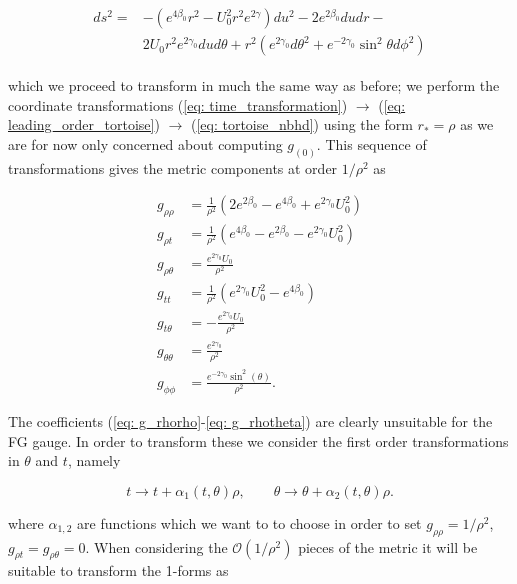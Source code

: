 \documentclass[a4paper,11pt]{article}
\numberwithin{equation}{section}
\begin{document}
\begin{align}
\begin{split} \label{eq: Bondi_metric_zero_functions}
ds^2=&-\left(e^{4\beta_{0}}r^2-U_{0}^2r^2e^{2\gamma}\right)du^2-2e^{2\beta_{0}}dudr- \\
&2U_{0}r^2e^{2\gamma_{0}}dud\theta+r^2(e^{2\gamma_{0}}d\theta^2+e^{-2\gamma_{0}}\sin^2\theta d\phi^2) 
\end{split}
\end{align}

\noindent which we proceed to transform in much the same way as before; we perform the coordinate transformations (\ref{eq: time_transformation}) $\rightarrow$ (\ref{eq: leading_order_tortoise}) $\rightarrow$ (\ref{eq: tortoise_nbhd}) using the form $r_*=\rho$ as we are for now only concerned about computing $g_{(0)}$. This sequence of transformations gives the metric components at order $1/\rho^2$ as 

\begin{subequations}
\begin{align}
g_{\rho \rho}&=\frac{1}{\rho^2}(2e^{2\beta_{0}}-e^{4\beta_{0}}+ e^{2\gamma_{0}} U_{0}^2) \label{eq: g_rhorho} \\
g_{\rho t}&=\frac{1}{\rho^2}(e^{4\beta_{0}}-e^{2\beta_{0}}-e^{2\gamma_{0}}U_{0}^2) \\
g_{\rho \theta}&=\frac{e^{2\gamma_{0}}U_{0}}{\rho^2} \label{eq: g_rhotheta} \\
g_{tt}&=\frac{1}{\rho^2}(e^{2\gamma_{0}}U_{0}^2-e^{4\beta_{0}}) \label{eq: g_tt} \\
g_{t \theta}&=-\frac{ e^{2\gamma_{0}} U_{0}}{\rho^2} \\
g_{\theta \theta}&=\frac{e^{2\gamma_{0}}}{\rho^2} \\
g_{\phi \phi}&=\frac{e^{-2\gamma_{0}}\sin^2(\theta)}{\rho^2} \label{eq: g_phiphi}.
\end{align}
\end{subequations}

The coefficients  (\ref{eq: g_rhorho}-\ref{eq: g_rhotheta}) are clearly unsuitable for the FG gauge. In order to transform these we consider the first order transformations in $\theta$ and $t$, namely 

\begin{equation} \label{eq: theta_t_transformations}
t \rightarrow t+ \alpha_1(t,\theta) \rho, \qquad \theta \rightarrow \theta + \alpha_2(t,\theta) \rho. 
\end{equation}

\noindent where $\alpha_{1,2}$ are functions which we want to to choose in order to set $g_{\rho \rho}=1/\rho^2$, $g_{\rho t}=g_{\rho \theta}=0$. When considering the $\mathcal{O}(1/\rho^2)$ pieces of the metric it will be suitable to transform the 1-forms as 
\end{document}
